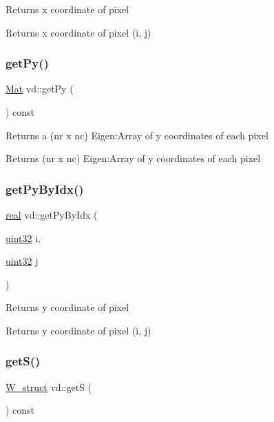 Returns x coordinate of pixel \begin{DoxyReturn}{Returns}
x coordinate of pixel (i, j) 
\end{DoxyReturn}
\mbox{\label{classvd_a9738711704b1d03cdbe027b1976cb0c6}} 
\subsubsection{\texorpdfstring{get\+Py()}{getPy()}}
{\footnotesize\ttfamily \mbox{\hyperlink{typedefs_8cpp_a9fa28c1f74e909474857584f5c7b0088}{Mat}} vd\+::get\+Py (\begin{DoxyParamCaption}{ }\end{DoxyParamCaption}) const}

Returns a (nr x nc) Eigen\+:Array of y coordinates of each pixel \begin{DoxyReturn}{Returns}
(nr x nc) Eigen\+:Array of y coordinates of each pixel 
\end{DoxyReturn}
\mbox{\label{classvd_ae6c4ff0f49e07803f5dd13545f6e8f3f}} 
\subsubsection{\texorpdfstring{get\+Py\+By\+Idx()}{getPyByIdx()}}
{\footnotesize\ttfamily \mbox{\hyperlink{typedefs_8cpp_a58a0c7cf2501f4492da833421be92547}{real}} vd\+::get\+Py\+By\+Idx (\begin{DoxyParamCaption}\item[{\mbox{\hyperlink{typedefs_8cpp_a8ad23e2333787a214e20a58a284a5a60}{uint32}}}]{i,  }\item[{\mbox{\hyperlink{typedefs_8cpp_a8ad23e2333787a214e20a58a284a5a60}{uint32}}}]{j }\end{DoxyParamCaption})}

Returns y coordinate of pixel \begin{DoxyReturn}{Returns}
y coordinate of pixel (i, j) 
\end{DoxyReturn}
\mbox{\label{classvd_a7f901e0c6d226b81f262c2363a69844a}} 
\subsubsection{\texorpdfstring{get\+S()}{getS()}}
{\footnotesize\ttfamily \mbox{\hyperlink{structW__struct}{W\+\_\+struct}} vd\+::getS (\begin{DoxyParamCaption}{ }\end{DoxyParamCaption}) const}

